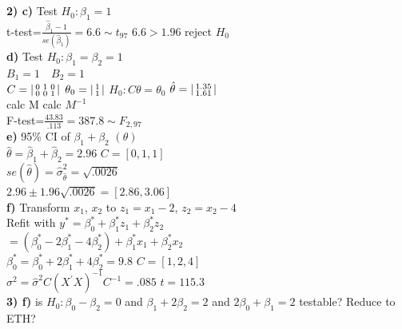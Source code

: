 \documentclass[10pt,landscape]{article}
\newenvironment{lsmallmatrix}
{\left|\begin{smallmatrix}}
	{\end{smallmatrix}\right|}
\newcommand{\B}{\beta}
\newcommand{\sg}{\sigma}
\newcommand{\hb}{\hat{\beta}}
\newcommand{\hth}{\hat{\theta}}
\begin{document}
\begin{multicols*}{4}
{\begin{tabular}{l|l|l|l|l|l}
	\hline
\end{tabular}}\\
\\
\textbf{2) c)} Test $H_0:\B_1=1$\\
t-test=$\frac{\hb_1-1}{se(\hb_1)}=6.6\sim t_{97}$ $6.6>1.96$ reject $H_0$\\
\textbf{d)} Test $H_0:\B_1=\B_2=1$\\
$B_1=1 \quad B_2=1$ \\
$C=\begin{lsmallmatrix}
0&1&0\\
0&0&1
\end{lsmallmatrix}$ $\theta_0=\begin{lsmallmatrix}
1\\
1
\end{lsmallmatrix}$ $H_0:C\theta=\theta_0$ $\hat{\theta}=\begin{lsmallmatrix}
1.35\\
1.61
\end{lsmallmatrix}$\\
calc M \quad calc $M^{-1}$\\
F-test=$\frac{43.83}{.113}=387.8\sim F_{2,97}$\\
\textbf{e)} 95\% CI of $\B_1+\B_2$ $(\theta)$\\
$\hth=\hb_1+\hb_2=2.96$ $C=[0,1,1]$\\
$se(\hth)=\hat{\sg}^2_{\hth}=\sqrt{.0026}$\\
$2.96\pm 1.96\sqrt{.0026}=[2.86,3.06]$\\
\textbf{f)} Transform $x_1$, $x_2$ to $z_1=x_1-2$, $z_2=x_2-4$\\
Refit with $y^*=\B_0^*+\B_1^*z_1+\B_2^*z_2$\\
$=(\B_0^*-2\B_1^*-4\B_2^*)+\B_1^*x_1+\B_2^*x_2$\\
$\B_0^*=\B_0^*+2\B_1^*+4\B_2^*=9.8$ $C=[1,2,4]$\\
$\sg^2=\hat{\sg}^2C(X^{'}X)^{-1}C^{-1}=.085$ $t=115.3$\\
\textbf{3) f)} is $H_0: \B_0-\B_2=0$ and $\B_1+2\B_2=2$ and $2\B_0+\B_1=2$ testable? Reduce to ETH?\\

\end{multicols*}
\end{document}
